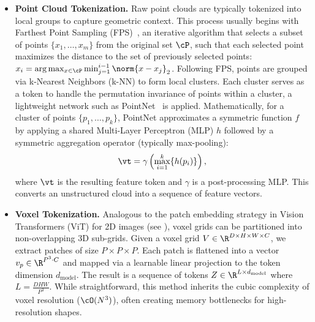 \documentclass[../../book-main.tex]{subfiles}
\begin{document}
\begin{itemize}
\item \textbf{Point Cloud Tokenization.} 
Raw point clouds are typically tokenized into local groups to capture 
geometric context.
This process usually begins with Farthest Point Sampling (FPS)~\citep{eldar1997farthest}, 
an iterative algorithm that selects a subset of points \(\{x_1, \dots, x_m\}\) 
from the original set \(\cP\), such that each selected point maximizes 
the distance to the set of previously selected points: 
\(x_{i} = \arg\max_{x \in \cP} \min_{j=1}^{i-1} \norm{x - x_j}_2\).
Following FPS, points are grouped via k-Nearest Neighbors (k-NN) to form local clusters.
Each cluster serves as a token to handle the permutation invariance of points 
within a cluster, a lightweight network such as PointNet~\citep{qi2017pointnet} is applied.
Mathematically, for a cluster of points \(\{p_1, \dots, p_k\}\), 
PointNet approximates a symmetric function \(f\) by applying a shared 
Multi-Layer Perceptron (MLP) \(h\) followed by a symmetric aggregation operator (typically max-pooling):
\begin{equation}
    \vt = \gamma \left( \max_{i=1}^k \{ h(p_i) \} \right) ,
\end{equation}
where \(\vt\) is the resulting feature token and \(\gamma\) is a post-processing MLP.
This converts an unstructured cloud into a sequence of feature vectors.

\item \textbf{Voxel Tokenization.} 
Analogous to the patch embedding strategy in Vision Transformers (ViT) for 2D images (see ), voxel grids can be partitioned into non-overlapping 3D sub-grids.
Given a voxel grid \(V \in \R^{D \times H \times W \times C}\), we extract patches of size \(P \times P \times P\).
Each patch is flattened into a vector \(v_p \in \R^{P^3 \cdot C}\) and mapped via a learnable linear projection to the token dimension \(d_{\mathrm{model}}\).
The result is a sequence of tokens \(Z \in \R^{L \times d_{\mathrm{model}}}\) where \(L = \frac{DHW}{P^3}\).
While straightforward, this method inherits the cubic complexity of voxel resolution (\(\cO(N^3)\)), often creating memory bottlenecks for high-resolution shapes.


\end{itemize}
\end{document}

